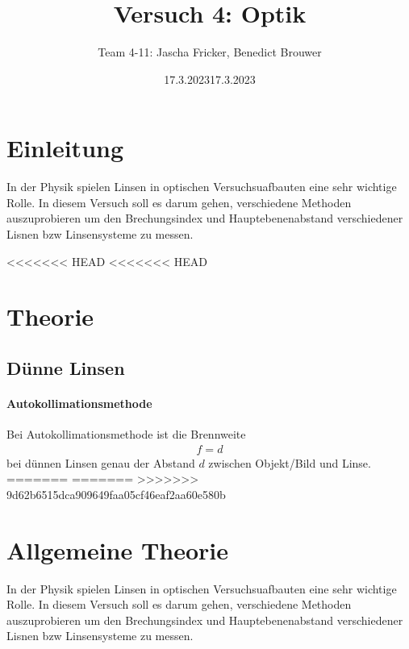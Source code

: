\documentclass[11pt, a4paper]{article}
\title{Versuch 4: Optik}
\author{Team 4-11: Jascha Fricker, Benedict Brouwer}
\date{17.3.2023}
\date{17.3.2023}
\begin{document}
    \def\Dimline[#1][#2][#3]{
        \begin{scope}[>=latex] %
            \draw let \p1=#1, \p2=#2, \n0={veclen(\x2-\x1,\y2-\y1)} in [|<->|,
            decoration={markings, %
                    mark=at position 0.5 with {\node[#3] at (0,0) {\DimScale{\n0}};},
            },
            postaction=decorate] #1 -- #2 ;
        \end{scope}
    }

    \def\DimScale#1{\pgfmathparse{round(#1/28.4*10.0)/10.0}\pgfmathresult cm}

    \maketitle

    \tableofcontents

    \newpage

    \section{Einleitung}
    In der Physik spielen Linsen in optischen Versuchsuafbauten eine sehr wichtige Rolle. In diesem Versuch soll es darum gehen, verschiedene 
    Methoden auszuprobieren um den Brechungsindex und Hauptebenenabstand verschiedener Lisnen bzw Linsensysteme zu messen.

<<<<<<< HEAD
<<<<<<< HEAD
    \section{Theorie}

    \subsection{Dünne Linsen}
    \paragraph{Autokollimationsmethode}
    Bei Autokollimationsmethode ist die Brennweite
    \begin{align}
        f = d \label{eq:auto}
    \end{align}
    bei dünnen Linsen genau der Abstand $d$ zwischen Objekt/Bild und Linse.
=======
=======
>>>>>>> 9d62b6515dca909649faa05cf46eaf2aa60e580b
    \section{Allgemeine Theorie}
    \FloatBarrier
    In der Physik spielen Linsen in optischen Versuchsuafbauten eine sehr wichtige Rolle. In diesem Versuch soll es darum gehen, verschiedene 
    Methoden auszuprobieren um den Brechungsindex und Hauptebenenabstand verschiedener Lisnen bzw Linsensysteme zu messen.
\end{document}
